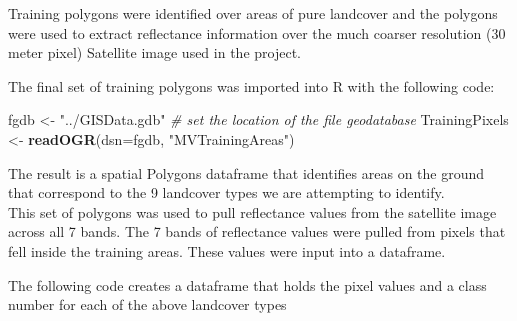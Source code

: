 \documentclass[]{article}
\newenvironment{Shaded}{\begin{snugshade}}{\end{snugshade}}
\newcommand{\KeywordTok}[1]{\textcolor[rgb]{0.13,0.29,0.53}{\textbf{#1}}}
\newcommand{\DataTypeTok}[1]{\textcolor[rgb]{0.13,0.29,0.53}{#1}}
\newcommand{\StringTok}[1]{\textcolor[rgb]{0.31,0.60,0.02}{#1}}
\newcommand{\CommentTok}[1]{\textcolor[rgb]{0.56,0.35,0.01}{\textit{#1}}}
\newcommand{\NormalTok}[1]{#1}
\begin{document}
Training polygons were identified over areas of pure landcover and the
polygons were used to extract reflectance information over the much
coarser resolution (30 meter pixel) Satellite image used in the project.

The final set of training polygons was imported into R with the
following code:

\begin{Shaded}
\begin{Highlighting}[]
\NormalTok{fgdb <-}\StringTok{ "../GISData.gdb"}  \CommentTok{# set the location of the file geodatabase}
\NormalTok{TrainingPixels <-}\StringTok{ }\KeywordTok{readOGR}\NormalTok{(}\DataTypeTok{dsn=}\NormalTok{fgdb, }\StringTok{"MVTrainingAreas"}\NormalTok{)}
\end{Highlighting}
\end{Shaded}

The result is a spatial Polygons dataframe that identifies areas on the
ground that correspond to the 9 landcover types we are attempting to
identify.\\
This set of polygons was used to pull reflectance values from the
satellite image across all 7 bands. The 7 bands of reflectance values
were pulled from pixels that fell inside the training areas. These
values were input into a dataframe.

The following code creates a dataframe that holds the pixel values and a
class number for each of the above landcover types
\end{document}
